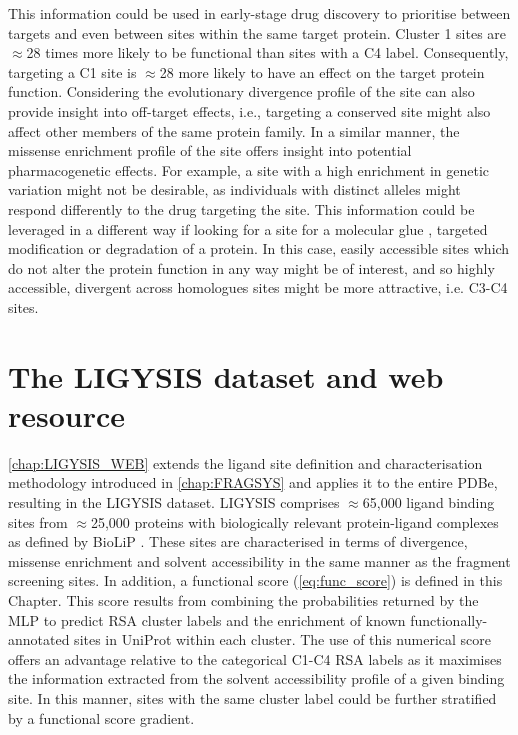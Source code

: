This information could be used in early-stage drug discovery to prioritise between targets and even between sites within the same target protein. Cluster 1 sites are $\approx$28 times more likely to be functional than sites with a C4 label. Consequently, targeting a C1 site is $\approx$28 more likely to have an effect on the target protein function. Considering the evolutionary divergence profile of the site can also provide insight into off-target effects, i.e., targeting a conserved site might also affect other members of the same protein family. In a similar manner, the missense enrichment profile of the site offers insight into potential pharmacogenetic effects. For example, a site with a high enrichment in genetic variation might not be desirable, as individuals with distinct alleles might respond differently to the drug targeting the site. This information could be leveraged in a different way if looking for a site for a molecular glue \cite{SCHREIBER_2021_GLUES}, targeted modification \cite{BREWER_2024_ATLAS, BREWER_2024_SMAD3, ZHAO_2024_TFEB} or degradation \cite{ZENGERLE_2015_BRD4, GADD_2017_PROTAC} of a protein. In this case, easily accessible sites which do not alter the protein function in any way might be of interest, and so highly accessible, divergent across homologues sites might be more attractive, i.e. C3-C4 sites.

\section{The LIGYSIS dataset and web resource}

\autoref{chap:LIGYSIS_WEB} extends the ligand site definition and characterisation methodology introduced in \autoref{chap:FRAGSYS} and applies it to the entire PDBe, resulting in the LIGYSIS dataset. LIGYSIS comprises $\approx$65,000 ligand binding sites from $\approx$25,000 proteins with biologically relevant protein-ligand complexes as defined by BioLiP \cite{YANG_2013_BIOLIP}. These sites are characterised in terms of divergence, missense enrichment and solvent accessibility in the same manner as the fragment screening sites. In addition, a functional score (\autoref{eq:func_score}) is defined in this Chapter. This score results from combining the probabilities returned by the MLP to predict RSA cluster labels and the enrichment of known functionally-annotated sites in UniProt \cite{NIGHTINGALE_2017_API} within each cluster. The use of this numerical score offers an advantage relative to the categorical C1-C4 RSA labels as it maximises the information extracted from the solvent accessibility profile of a given binding site. In this manner, sites with the same cluster label could be further stratified by a functional score gradient.

